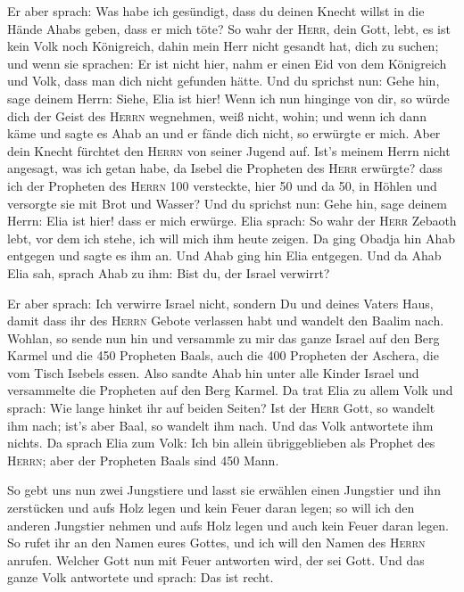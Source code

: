  Er aber sprach: Was habe ich gesündigt, dass du deinen
Knecht willst in die Hände Ahabs geben, dass er mich töte?
 So wahr der \textsc{Herr}, dein Gott, lebt, es ist kein
Volk noch Königreich, dahin mein Herr nicht gesandt hat, dich zu suchen;
und wenn sie sprachen: Er ist nicht hier, nahm er einen Eid von dem
Königreich und Volk, dass man dich nicht gefunden hätte. 
Und du sprichst nun: Gehe hin, sage deinem Herrn: Siehe, Elia ist hier!
 Wenn ich nun hinginge von dir, so würde dich der Geist
des \textsc{Herrn} wegnehmen, weiß nicht, wohin; und wenn ich dann käme
und sagte es Ahab an und er fände dich nicht, so erwürgte er mich. Aber
dein Knecht fürchtet den \textsc{Herrn} von seiner Jugend auf.
 Ist's meinem Herrn nicht angesagt, was ich getan habe,
da Isebel die Propheten des \textsc{Herr} erwürgte? dass ich der
Propheten des \textsc{Herrn} 100 versteckte, hier 50 und da 50, in
Höhlen und versorgte sie mit Brot und Wasser?  Und du
sprichst nun: Gehe hin, sage deinem Herrn: Elia ist hier! dass er mich
erwürge.  Elia sprach: So wahr der \textsc{Herr} Zebaoth
lebt, vor dem ich stehe, ich will mich ihm heute zeigen. 
Da ging Obadja hin Ahab entgegen und sagte es ihm an. Und Ahab ging hin
Elia entgegen.  Und da Ahab Elia sah, sprach Ahab zu ihm:
Bist du, der Israel verwirrt?

 Er aber sprach: Ich verwirre Israel nicht, sondern Du
und deines Vaters Haus, damit dass ihr des \textsc{Herrn} Gebote
verlassen habt und wandelt den Baalim nach.  Wohlan, so
sende nun hin und versammle zu mir das ganze Israel auf den Berg Karmel
und die 450 Propheten Baals, auch die 400 Propheten der Aschera, die vom
Tisch Isebels essen.  Also sandte Ahab hin unter alle
Kinder Israel und versammelte die Propheten auf den Berg Karmel.
 Da trat Elia zu allem Volk und sprach: Wie lange hinket
ihr auf beiden Seiten? Ist der \textsc{Herr} Gott, so wandelt ihm nach;
ist's aber Baal, so wandelt ihm nach. Und das Volk antwortete ihm
nichts.  Da sprach Elia zum Volk: Ich bin allein
übriggeblieben als Prophet des \textsc{Herrn}; aber der Propheten Baals
sind 450 Mann.

 So gebt uns nun zwei Jungstiere und lasst sie erwählen
einen Jungstier und ihn zerstücken und aufs Holz legen und kein Feuer
daran legen; so will ich den anderen Jungstier nehmen und aufs Holz
legen und auch kein Feuer daran legen.  So rufet ihr an
den Namen eures Gottes, und ich will den Namen des \textsc{Herrn}
anrufen. Welcher Gott nun mit Feuer antworten wird, der sei Gott. Und
das ganze Volk antwortete und sprach: Das ist recht.

